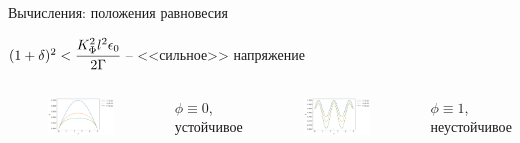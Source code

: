 \begin{frame}{Вычисления: положения равновесия}
\vspace{-0.4cm}
\begin{center}
	$(1 + \delta)^2 < \cfrac{K_\Phi^2 l^2 \epsilon_0}{2 \Gamma}$ -- <<сильное>> напряжение
\end{center}
\vspace{-0.4cm}
\begin{columns}
\begin{figure}
	\includegraphics[width=\textwidth]{figures/equilibrium_3_0.png}
\end{figure}
\vspace{-0.8cm}
\begin{center}
	$\phi \equiv 0$, устойчивое
\end{center}
\begin{figure}
	\includegraphics[width=\textwidth]{figures/equilibrium_3_1.png}
\end{figure}
\vspace{-0.8cm}
\begin{center}
	$\phi \equiv 1$, неустойчивое
\end{center}
\end{columns}
\end{frame}


